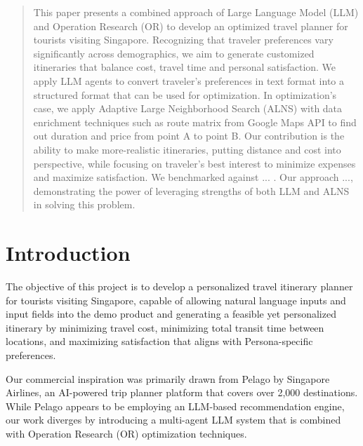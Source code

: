 \documentclass{ecai}
\begin{document}
\begin{frontmatter}
\begin{abstract}
This paper presents a combined approach of Large Language Model (LLM) and Operation Research (OR) to develop an optimized travel planner for tourists visiting Singapore. Recognizing that traveler preferences vary significantly across demographics, we aim to generate customized itineraries that balance cost, travel time and personal satisfaction. We apply LLM agents to convert traveler's preferences in text format into a structured format that can be used for optimization. In optimization's case, we apply Adaptive Large Neighborhood Search (ALNS) with data enrichment techniques such as route matrix from Google Maps API to find out duration and price from point A to point B. Our contribution is the ability to make more-realistic itineraries, putting distance and cost into perspective, while focusing on traveler's best interest to minimize expenses and maximize satisfaction. We benchmarked against ... . Our approach ..., demonstrating the power of leveraging strengths of both LLM and ALNS in solving this problem.

\end{abstract}

\end{frontmatter}


\section{Introduction}
The objective of this project is to develop a personalized travel itinerary planner for tourists visiting Singapore, capable of allowing natural language inputs and input fields into the demo product and generating a feasible yet personalized itinerary by minimizing travel cost, minimizing total transit time between locations, and maximizing satisfaction that aligns with Persona-specific preferences.

Our commercial inspiration was primarily drawn from Pelago by Singapore Airlines, an AI-powered trip planner platform that covers over 2,000 destinations. While Pelago appears to be employing an LLM-based recommendation engine, our work diverges by introducing a multi-agent LLM system that is combined with Operation Research (OR) optimization techniques.
\end{document}
